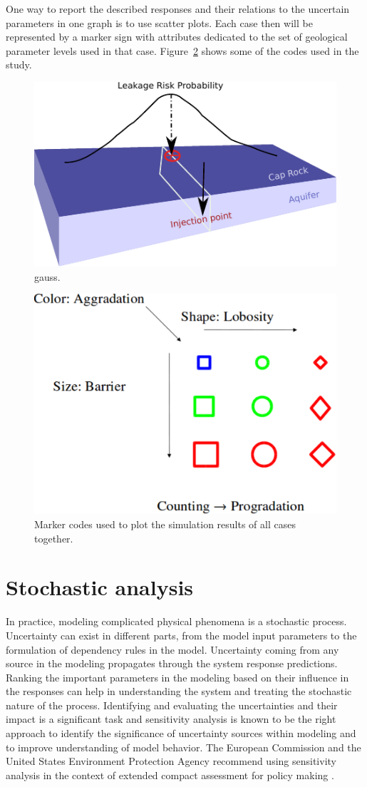 One way to report the described responses and their relations to the uncertain parameters in one graph is to use scatter plots. Each case then will be represented by a marker sign with attributes dedicated to the set of geological parameter levels used in that case. Figure~\ref{fig:codes} shows some of the codes used in the study.


\begin{figure}
  \centering
  \includegraphics[width=0.65 \linewidth]{./figurer/LR_2} 
  \caption{gauss.}
  \label{fig:SLR}
%
\end{figure}


\begin{figure}
  \centering
  \includegraphics[width=0.65 \linewidth]{./figurer/codes} 
  \caption{Marker codes used to plot the simulation results of all cases together.}
  \label{fig:codes}
%
\end{figure}


\section{Stochastic analysis}

In practice, modeling complicated physical phenomena is a stochastic process. Uncertainty can exist in different parts, from the model input parameters to the formulation of dependency rules in the model. Uncertainty coming from any source in the modeling propagates through the system response predictions. Ranking the important parameters in the modeling based on their influence in the responses can help in understanding the system and treating the stochastic nature of the process. Identifying and evaluating the uncertainties and their impact is a significant task and sensitivity analysis is known to be the right approach to identify the significance of uncertainty sources within modeling and to improve understanding of model behavior. The European Commission and the United States Environment Protection Agency recommend using sensitivity analysis in the context of extended compact assessment for policy making \cite{saltelli4global}.

